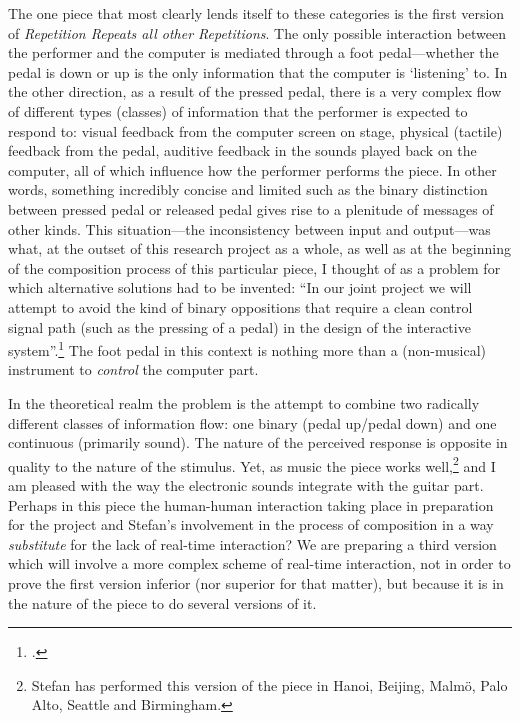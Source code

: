 The one piece that most clearly lends itself to these categories is the first version of \emph{Repetition Repeats all other Repetitions}. The only possible interaction between the performer and the computer is mediated through a foot pedal---whether the pedal is down or up is the only information that the computer is `listening' to. In the other direction, as a result of the pressed pedal, there is a very complex flow of different types (classes) of information that the performer is expected to respond to: visual feedback from the computer screen on stage, physical (tactile) feedback from the pedal, auditive feedback in the sounds played back on the computer, all of which influence how the performer performs the piece. In other words, something incredibly concise and limited such as the binary distinction between pressed pedal or released pedal gives rise to a plenitude of messages of other kinds. This situation---the inconsistency between input and output---was what, at the outset of this research project as a whole, as well as at the beginning of the composition process of this particular piece, I thought of as a problem for which alternative solutions had to be invented: ``In our joint project we will attempt to avoid the kind of binary oppositions that require a clean control signal path (such as the pressing of a pedal) in the design of the interactive system''.\footcite{frisk-ost06} The foot pedal in this context is nothing more than a (non-musical) instrument to \emph{control} the computer part.


In the theoretical realm the problem is the attempt to combine two radically different classes of information flow: one binary (pedal up/pedal down) and one continuous (primarily sound). The nature of the perceived response is opposite in quality to the nature of the stimulus.
Yet, as music the piece works well,\footnote{Stefan has performed this version of the piece in Hanoi, Beijing, Malm\"{o}, Palo Alto, Seattle and Birmingham.} and I am pleased with the way the electronic sounds integrate with the guitar part. Perhaps in this piece the human-human interaction taking place in preparation for the project and Stefan's involvement in the process of composition in a way \emph{substitute} for the lack of real-time interaction? We are preparing a third version which will involve a more complex scheme of real-time interaction, not in order to prove the first version inferior (nor superior for that matter), but because it is in the nature of the piece to do several versions of it.

